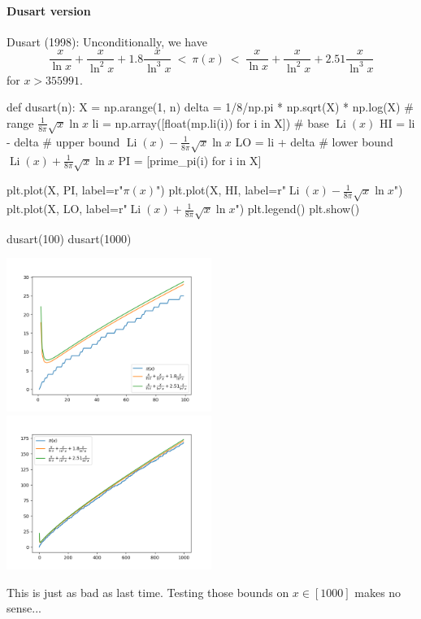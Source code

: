 \documentclass{article}
\newcommand{\Li}{\operatorname{Li}}
\begin{document}
  \paragraph*{Dusart version}
  \begin{centerframebox}
    Dusart (1998): Unconditionally, we have
    \[ \frac{x}{\ln x} + \frac{x}{\ln^2 x} + 1.8\frac{x}{\ln^3 x} ~<~ \pi(x) ~<~ \frac{x}{\ln x} + \frac{x}{\ln^2 x} + 2.51\frac{x}{\ln^3 x} \]
    for $x > 355991$.
  \end{centerframebox}
  \begin{mylisting}
    def dusart(n):
      X = np.arange(1, n)
      delta = 1/8/np.pi * np.sqrt(X) * np.log(X) # range $\frac{1}{8\pi}\sqrt{x}\ln x$
      li = np.array([float(mp.li(i)) for i in X]) # base $\Li(x)$
      HI = li - delta # upper bound $\Li(x)-\frac{1}{8\pi}\sqrt{x}\ln x$
      LO = li + delta # lower bound $\Li(x)+\frac{1}{8\pi}\sqrt{x}\ln x$
      PI = [prime_pi(i) for i in X]

      plt.plot(X, PI, label=r"$\pi(x)$")
      plt.plot(X, HI, label=r"$\Li(x)-\frac{1}{8\pi}\sqrt{x}\ln x$")
      plt.plot(X, LO, label=r"$\Li(x)+\frac{1}{8\pi}\sqrt{x}\ln x$")
      plt.legend()
      plt.show()

    dusart(100)
    dusart(1000)
  \end{mylisting}

  \noindent
  \includegraphics[width=0.5\textwidth]{dusart100}%
  \includegraphics[width=0.5\textwidth]{dusart1000}

  This is just as bad as last time. Testing those bounds on $x \in [1000]$ makes no sense...
\end{document}
